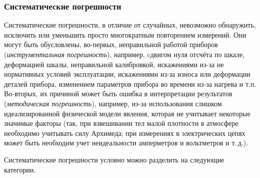 
\subsubsection{Систематические погрешности}

Систематические погрешности, в отличие от случайных, невозможно обнаружить,
исключить или уменьшить просто многократным повторением измерений.
Они могут быть обусловлены, во-первых, неправильной работой приборов
(\emph{инструментальная погрешность}), например, cдвигом нуля отсчёта
по шкале, деформацией шкалы, неправильной калибровкой, искажениями
из-за не нормативных условий эксплуатации, искажениями из-за износа
или деформации деталей прибора, изменением параметров прибора во времени
из-за нагрева и т.п. Во-вторых, их причиной может быть ошибка в интерпретации
результатов (\emph{методическая погрешность}), например, из-за использования
слишком идеализированной физической модели явления, которая не учитывает
некоторые значимые факторы (так, при взвешивании тел малой плотности
в атмосфере необходимо учитывать силу Архимеда; при измерениях в электрических
цепях может быть необходим учет неидеальности амперметров и вольтметров
и т.\,д.).

Систематические погрешности условно можно разделить на следующие категории.

